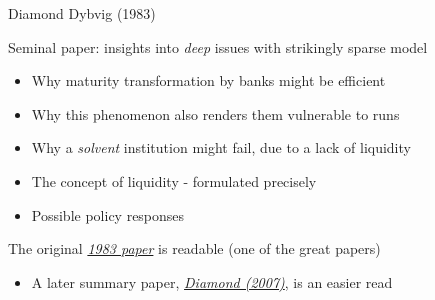 

\begin{frame}{Diamond Dybvig (1983)}

Seminal paper: insights into \textit{deep} issues with strikingly sparse model
	\begin{itemize}
	\item	Why maturity transformation by banks might be efficient
	\item	Why this phenomenon also renders them vulnerable to runs
	\item	Why a \textit{solvent} institution might fail, due to a lack of liquidity
	\item	The concept of liquidity - formulated precisely
	\item	Possible policy responses
	\end{itemize}
\vspace{2mm}
The original \href{https://ideas.repec.org/a/ucp/jpolec/v91y1983i3p401-19.html}{\emph{1983 paper}} is readable (one of the great papers)
	\begin{itemize}
	\item	A later summary paper, \href{https://www.richmondfed.org/-/media/richmondfedorg/publications/research/economic_quarterly/2007/spring/pdf/diamond.pdf}{\emph{Diamond (2007)}}, is an easier read
	\end{itemize}

\end{frame}



